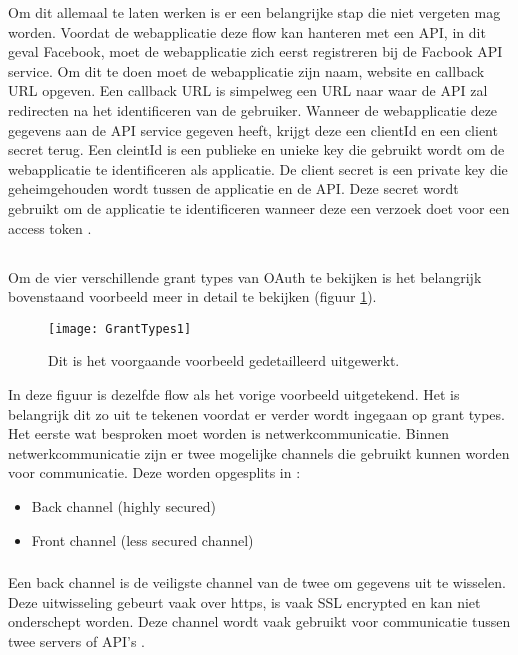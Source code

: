 Om dit allemaal te laten werken is er een belangrijke stap die niet vergeten mag worden. Voordat de webapplicatie deze flow kan hanteren met een API, in dit geval Facebook, moet de webapplicatie zich eerst registreren bij de Facbook API service. Om dit te doen moet de webapplicatie zijn naam, website en callback URL opgeven. Een callback URL is simpelweg een URL naar waar de API zal redirecten na het identificeren van de gebruiker. Wanneer de webapplicatie deze gegevens aan de API service gegeven heeft, krijgt deze een clientId en een client secret terug. Een cleintId is een publieke en unieke key die gebruikt wordt om de webapplicatie te identificeren als applicatie. De client secret is een private key die geheimgehouden wordt tussen de applicatie en de API. Deze secret wordt gebruikt om de applicatie te identificeren wanneer deze een verzoek doet voor een access token \autocite{OktaDev2018}. 

\subsection{}
Om de vier verschillende grant types van OAuth te bekijken is het belangrijk bovenstaand voorbeeld meer in detail te bekijken (figuur \ref{fig:grantTypes1}).
\begin{figure}[H]
	\centering
	\texttt{[image: GrantTypes1]} 
	\caption[Gedetailleerd voorbeeld voor uitleg grant types]{Dit is het voorgaande voorbeeld gedetailleerd uitgewerkt.}
	\label{fig:grantTypes1}
\end{figure}
In deze figuur is dezelfde flow als het vorige voorbeeld uitgetekend. Het is belangrijk dit zo uit te tekenen voordat er verder wordt ingegaan op grant types.
Het eerste wat besproken moet worden is netwerkcommunicatie. Binnen netwerkcommunicatie zijn er twee mogelijke channels die gebruikt kunnen worden voor communicatie. Deze worden opgesplits in \autocite{OktaDev2018}: 
\begin{itemize}
	\item Back channel (highly secured)
	\item Front channel (less secured channel)
\end{itemize}
\subsubsection{}
Een back channel is de veiligste channel van de twee om gegevens uit te wisselen. Deze uitwisseling gebeurt vaak over https, is vaak SSL encrypted en kan niet onderschept worden. Deze channel wordt vaak gebruikt voor communicatie tussen twee servers of API's \autocite{OktaDev2018}.
